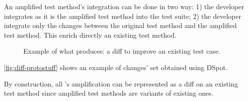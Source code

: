 An amplified test method's integration can be done in two way:
1) the developer integrates as it is the amplified test method into the test suite;
2) the developer integrate only the changes between the original test method and the amplified test method.
This enrich directly an existing test method.

\begin{figure}[h]
	\centering{}
	\caption{Example of what \dspot produces: a diff to improve an existing test case.}
	\label{fig:diff-protostuff}
\end{figure}

\autoref{fig:diff-protostuff} shows an example of changes' set obtained using DSpot.

By construction, all \dspot's amplification can be represented as a diff on an existing test method since amplified test methods are variants of existing ones.

